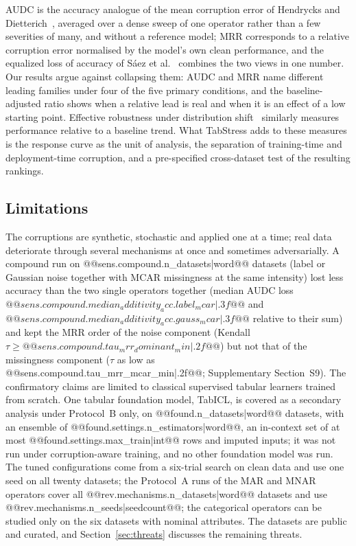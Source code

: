 \documentclass[pdflatex,sn-mathphys]{sn-jnl}
\theoremstyle{thmstyleone}
\theoremstyle{thmstyletwo}
\theoremstyle{thmstylethree}
\begin{document}
AUDC is the accuracy analogue of the mean corruption error of Hendrycks and Dietterich~\cite{hendrycks2019benchmarking}, averaged over a dense sweep of one operator rather than a few severities of many, and without a reference model; MRR corresponds to a relative corruption error normalised by the model's own clean performance, and the equalized loss of accuracy of S\'aez et al.~\cite{saez2015evaluating} combines the two views in one number. Our results argue against collapsing them: AUDC and MRR name different leading families under four of the five primary conditions, and the baseline-adjusted ratio shows when a relative lead is real and when it is an effect of a low starting point. Effective robustness under distribution shift~\cite{taori2020measuring} similarly measures performance relative to a baseline trend. What TabStress adds to these measures is the response curve as the unit of analysis, the separation of training-time and deployment-time corruption, and a pre-specified cross-dataset test of the resulting rankings.

\subsection{Limitations}\label{sec:disc:limits}

The corruptions are synthetic, stochastic and applied one at a time; real data deteriorate through several mechanisms at once and sometimes adversarially. A compound run on @@{sens.compound.n_datasets|word}@@ datasets (label or Gaussian noise together with MCAR missingness at the same intensity) lost less accuracy than the two single operators together (median AUDC loss $@@{sens.compound.median_additivity_acc.label_mcar|.3f}@@$ and $@@{sens.compound.median_additivity_acc.gauss_mcar|.3f}@@$ relative to their sum) and kept the MRR order of the noise component (Kendall $\tau\ge@@{sens.compound.tau_mrr_dominant_min|.2f}@@$) but not that of the missingness component ($\tau$ as low as @@{sens.compound.tau_mrr_mcar_min|.2f}@@; Supplementary Section~S9). The confirmatory claims are limited to classical supervised tabular learners trained from scratch. One tabular foundation model, TabICL, is covered as a secondary analysis under Protocol~B only, on @@{found.n_datasets|word}@@ datasets, with an ensemble of @@{found.settings.n_estimators|word}@@, an in-context set of at most @@{found.settings.max_train|int}@@ rows and imputed inputs; it was not run under corruption-aware training, and no other foundation model was run. The tuned configurations come from a six-trial search on clean data and use one seed on all twenty datasets; the Protocol~A runs of the MAR and MNAR operators cover all @@{rev.mechanisms.n_datasets|word}@@ datasets and use @@{rev.mechanisms.n_seeds|seedcount}@@; the categorical operators can be studied only on the six datasets with nominal attributes. The datasets are public and curated, and Section~\ref{sec:threats} discusses the remaining threats.
\end{document}
